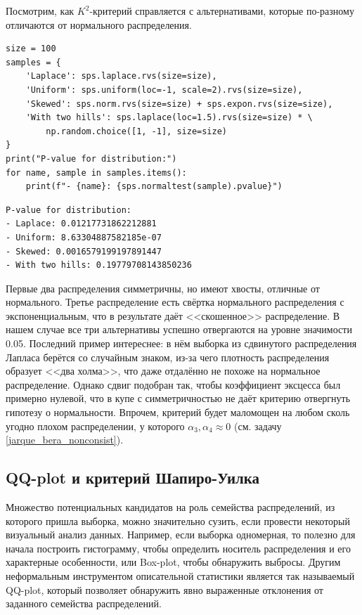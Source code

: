 \begin{example}
    Посмотрим, как $K^2$-критерий справляется с альтернативами, которые по-разному отличаются от нормального распределения.
    \begin{verbatim}
size = 100
samples = {
    'Laplace': sps.laplace.rvs(size=size), 
    'Uniform': sps.uniform(loc=-1, scale=2).rvs(size=size), 
    'Skewed': sps.norm.rvs(size=size) + sps.expon.rvs(size=size), 
    'With two hills': sps.laplace(loc=1.5).rvs(size=size) * \
        np.random.choice([1, -1], size=size)
}
print("P-value for distribution:")
for name, sample in samples.items():
    print(f"- {name}: {sps.normaltest(sample).pvalue}")
    \end{verbatim}
    \begin{lstlisting}
P-value for distribution:
- Laplace: 0.01217731862212881
- Uniform: 8.63304887582185e-07
- Skewed: 0.0016579199197891447
- With two hills: 0.19779708143850236
    \end{lstlisting}

Первые два распределения симметричны, но имеют хвосты, отличные от нормального. Третье распределение есть свёртка нормального распределения с экспоненциальным, что в результате даёт <<скошенное>> распределение. В нашем случае все три альтернативы успешно отвергаются на уровне значимости 0.05. Последний пример интереснее: в нём выборка из сдвинутого распределения Лапласа берётся со случайным знаком, из-за чего плотность распределения образует <<два холма>>, что даже отдалённо не похоже на нормальное распределение. Однако сдвиг подобран так, чтобы коэффициент эксцесса был примерно нулевой, что в купе с симметричностью не даёт критерию отвергнуть гипотезу о нормальности. Впрочем, критерий будет маломощен на любом сколь угодно плохом распределении, у которого $\alpha_3, \alpha_4 \approx 0$ (см. задачу \ref{jarque_bera_nonconsist}).
\end{example}

\subsection{QQ-plot и критерий Шапиро-Уилка}\label{qq_plot}

Множество потенциальных кандидатов на роль семейства распределений, из которого пришла выборка, можно значительно сузить, если провести некоторый визуальный анализ данных. Например, если выборка одномерная, то полезно для начала построить гистограмму, чтобы определить носитель распределения и его характерные особенности, или Box-plot, чтобы обнаружить выбросы. Другим неформальным инструментом описательной статистики является так называемый QQ-plot, который позволяет обнаружить явно выраженные отклонения от заданного семейства распределений.

